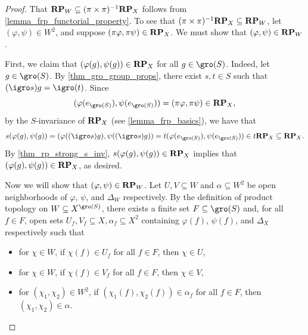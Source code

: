 \begin{proof}
    That $\mathbf{RP}_W \subseteq (\pi \times \pi)^{-1} \mathbf{RP}_X$ follows from \cref{lemma_frp_functorial_property}.  To see that $(\pi \times \pi)^{-1} \mathbf{RP}_X \subseteq \mathbf{RP}_W$, let $(\varphi, \psi) \in W^2$, and suppose $(\pi \varphi, \pi \psi) \in \mathbf{RP}_X$.  We must show that $(\varphi, \psi) \in \mathbf{RP}_W$.
    
    First, we claim that $(\varphi(g), \psi(g)) \in \mathbf{RP}_X$ for all $g \in \gro(S)$.  Indeed, let $g \in \gro(S)$.  By \cref{thm_gro_group_props}, there exist $s, t \in S$ such that $(\igro s)g = \igro(t)$.  Since
    \[
        (\varphi(e_{\gro(S)}), \psi(e_{\gro(S)})) = (\pi \varphi, \pi \psi) \in \RP_X,
    \]
    by the $S$-invariance of $\mathbf{RP}_X$ (see \cref{lemma_frp_basics}), we have that
    \[
        s(\varphi(g), \psi(g)) = (\varphi((\igro s)g), \psi((\igro s)g)) = t (\varphi(e_{\gro(S)}), \psi(e_{\gro(S)})) \in t\RP_X \subseteq \RP_X.
    \]
    By \cref{thm_rp_strong_s_inv}, $s(\varphi(g), \psi(g)) \in \mathbf{RP}_X$ implies that $(\varphi(g), \psi(g)) \in \mathbf{RP}_X$, as desired.

    Now we will show that $(\varphi, \psi) \in \mathbf{RP}_W$.  Let $U, V \subseteq W$ and $\alpha \subseteq W^2$ be open neighborhoods of $\varphi$, $\psi$, and $\Delta_W$ respectively. By the definition of product topology on $W \subseteq X^{\gro(S)}$, there exists a finite set $F \subseteq \gro(S)$ and, for all $f \in F$, open sets $U_f, V_f \subseteq X, \alpha_f \subseteq X^2$ containing $\varphi(f)$, $\psi(f)$, and $\Delta_X$ respectively such that
    \begin{itemize}
        \item for $\chi \in W$, if $\chi(f) \in U_f$ for all $f \in F$, then $\chi \in U$,

        \item for $\chi \in W$, if $\chi (f) \in V_f$ for all $f \in F$, then $\chi \in V$,

        \item for $(\chi_1, \chi_2) \in W^2$, if $(\chi_1(f), \chi_2(f)) \in \alpha_f$ for all $f \in F$, then $(\chi_1, \chi_2) \in \alpha$.
    \end{itemize}
    

\end{proof}

